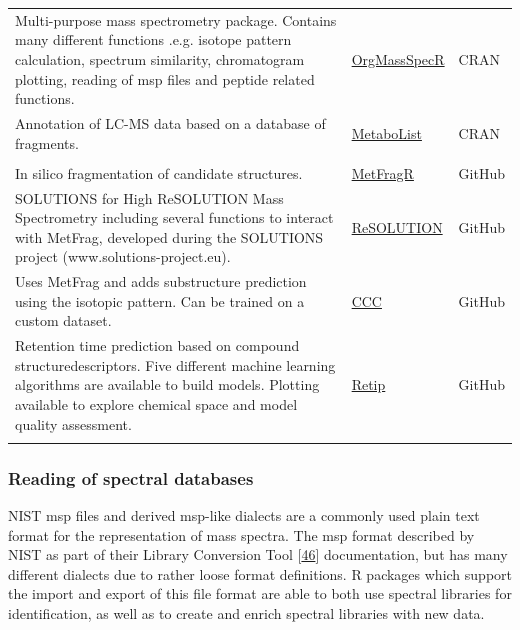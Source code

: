\documentclass[]{article}
\begin{document}
\begin{longtable}[t]{>{\raggedright\arraybackslash}p{30em}>{\raggedright\arraybackslash}p{10em}>{\raggedright\arraybackslash}p{3em}}
Multi-purpose mass spectrometry package. Contains many different functions .e.g. isotope pattern calculation, spectrum similarity, chromatogram plotting, reading of msp files and peptide related functions. & \href{https://cran.r-project.org/package=OrgMassSpecR}{OrgMassSpecR} & CRAN\\
\rowcolor{gray!6}  Annotation of LC-MS data based on a database of fragments. & \href{https://cran.r-project.org/package=MetaboList}{MetaboList} & CRAN\\
\addlinespace[0.3em]
\multicolumn{3}{l}{\textbf{In silico fragmentation}}\\
In silico fragmentation of candidate structures. & \href{https://github.com/c-ruttkies/MetFragR}{MetFragR} & GitHub\\
\rowcolor{gray!6}  SOLUTIONS for High ReSOLUTION Mass Spectrometry including several functions to interact with MetFrag, developed during the SOLUTIONS project (www.solutions-project.eu). & \href{https://github.com/schymane/ReSOLUTION}{ReSOLUTION} & GitHub\\
Uses MetFrag and adds substructure prediction using the isotopic pattern. Can be trained on a custom dataset. & \href{https://github.com/lucanard/CCC}{CCC} & GitHub\\
\rowcolor{gray!6}  Retention time prediction based on compound structuredescriptors. Five different machine learning algorithms are available to build models. Plotting available to explore chemical space and model quality assessment. & \href{https://github.com/PaoloBnn/Retip}{Retip} & GitHub\\*
\end{longtable}

\hypertarget{reading-of-spectral-databases}{%
\subsubsection{Reading of spectral databases}\label{reading-of-spectral-databases}}

NIST msp files and derived msp-like dialects are a commonly used plain text format for the representation of mass spectra. The msp format described by NIST as part of their Library Conversion Tool {[}\protect\hyperlink{ref-thenationalinstituteofstandardsandtechnology_website_2012}{46}{]} documentation, but has many different dialects due to rather loose format definitions. R packages which support the import and export of this file format are able to both use spectral libraries for identification, as well as to create and enrich spectral libraries with new data.
\end{document}
